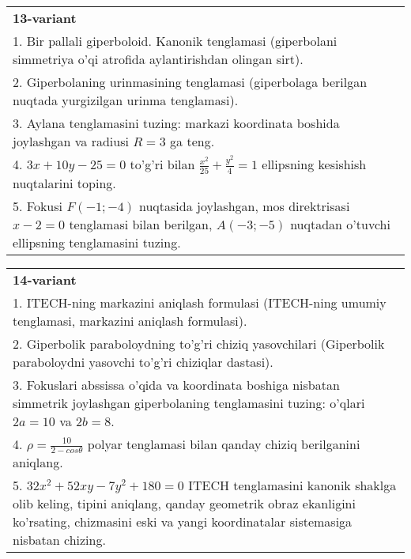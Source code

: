 \documentclass{article}
\begin{document}
\begin{tabular}{m{17cm}}
\textbf{13-variant}\\
1. Bir pallali giperboloid. Kanonik tenglamasi (giperbolani simmetriya o'qi atrofida aylantirishdan olingan sirt).\\

2. Giperbolaning urinmasining tenglamasi (giperbolaga berilgan nuqtada yurgizilgan urinma tenglamasi).\\

3. Aylana tenglamasini tuzing: markazi koordinata boshida joylashgan va radiusi $R=3$ ga teng.\\

4. $3x + 10y - 25 = 0$ to'g'ri bilan $\frac{x^{2}}{25} + \frac{y^{2}}{4} = 1$ ellipsning kesishish nuqtalarini toping.  \\

5. Fokusi $F( - 1; - 4)$ nuqtasida joylashgan, mos direktrisasi $x - 2 = 0$ tenglamasi bilan berilgan, $A( - 3; - 5)$ nuqtadan o'tuvchi ellipsning tenglamasini tuzing.  
\end{tabular}
\vspace{1cm}


\begin{tabular}{m{17cm}}
\textbf{14-variant}\\
1. ITECH-ning markazini aniqlash formulasi (ITECH-ning umumiy tenglamasi, markazini aniqlash formulasi).\\

2. Giperbolik paraboloydning to'g'ri chiziq yasovchilari (Giperbolik paraboloydni yasovchi to'g'ri chiziqlar dastasi).\\

3. Fokuslari abssissa o'qida va koordinata boshiga nisbatan simmetrik joylashgan giperbolaning tenglamasini tuzing: o'qlari $2a=10$ va $2b=8$.\\

4. $\rho = \frac{10}{2 - cos\theta}$ polyar tenglamasi bilan qanday chiziq berilganini aniqlang.  \\

5. $32x^{2} + 52xy - 7y^{2} + 180 = 0$ ITECH tenglamasini kanonik shaklga olib keling, tipini aniqlang, qanday geometrik obraz ekanligini ko'rsating, chizmasini eski va yangi koordinatalar sistemasiga nisbatan chizing.  
\end{tabular}
\vspace{1cm}
\end{document}

